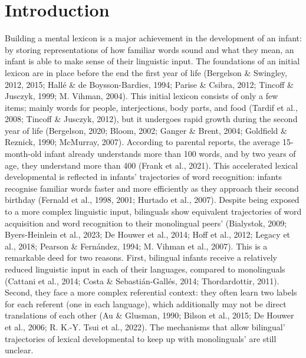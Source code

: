 \documentclass[
  12pt,
  b5paperpaper,
  twoside]{scrreprt}
\begin{document}
\hypertarget{introduction-1}{%
\section{Introduction}\label{introduction-1}}

Building a mental lexicon is a major achievement in the development of
an infant: by storing representations of how familiar words sound and
what they mean, an infant is able to make sense of their linguistic
input. The foundations of an initial lexicon are in place before the end
the first year of life (Bergelson \& Swingley, 2012, 2015; Hallé \& de
Boysson-Bardies, 1994; Parise \& Csibra, 2012; Tincoff \& Jusczyk, 1999;
M. Vihman, 2004). This initial lexicon consists of only a few items;
mainly words for people, interjections, body parts, and food (Tardif et
al., 2008; Tincoff \& Jusczyk, 2012), but it undergoes rapid growth
during the second year of life (Bergelson, 2020; Bloom, 2002; Ganger \&
Brent, 2004; Goldfield \& Reznick, 1990; McMurray, 2007). According to
parental reports, the average 15-month-old infant already understands
more than 100 words, and by two years of age, they understand more than
400 (Frank et al., 2021). This accelerated lexical developmental is
reflected in infants' trajectories of word recognition: infants
recognise familiar words faster and more efficiently as they approach
their second birthday (Fernald et al., 1998, 2001; Hurtado et al.,
2007). Despite being exposed to a more complex linguistic input,
bilinguals show equivalent trajectories of word acquisition and word
recognition to their monolingual peers' (Bialystok, 2009; Byers-Heinlein
et al., 2023; De Houwer et al., 2014; Hoff et al., 2012; Legacy et al.,
2018; Pearson \& Fernández, 1994; M. Vihman et al., 2007). This is a
remarkable deed for two reasons. First, bilingual infants receive a
relatively reduced linguistic input in each of their languages, compared
to monolinguals (Cattani et al., 2014; Costa \& Sebastián-Gallés, 2014;
Thordardottir, 2011). Second, they face a more complex referential
context: they often learn two labels for each referent (one in each
language), which additionally may not be direct translations of each
other (Au \& Glusman, 1990; Bilson et al., 2015; De Houwer et al., 2006;
R. K.-Y. Tsui et al., 2022). The mechanisms that allow bilingual'
trajectories of lexical developmental to keep up with monolinguals' are
still unclear.
\end{document}
